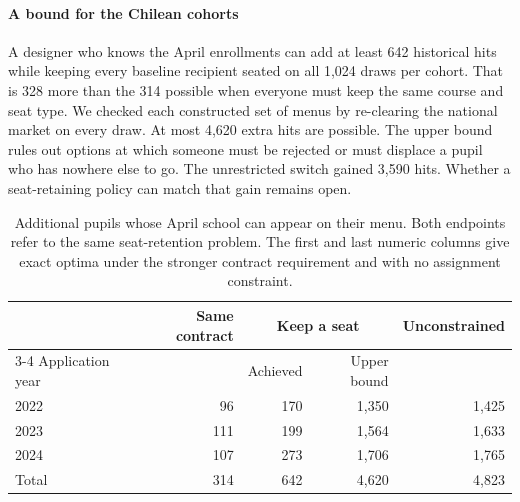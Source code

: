 \paragraph{A bound for the Chilean cohorts}
A designer who knows the April enrollments can add at least 642 historical hits while keeping every baseline recipient seated on all 1,024 draws per cohort. That is 328 more than the 314 possible when everyone must keep the same course and seat type. We checked each constructed set of menus by re-clearing the national market on every draw. At most 4,620 extra hits are possible. The upper bound rules out options at which someone must be rejected or must displace a pupil who has nowhere else to go. The unrestricted switch gained 3,590 hits. Whether a seat-retaining policy can match that gain remains open.

\begin{table}[ht]\centering\small
\caption{Additional pupils whose April school can appear on their menu. Both endpoints refer to the same seat-retention problem. The first and last numeric columns give exact optima under the stronger contract requirement and with no assignment constraint.}\label{tab:retention-bounds}
\begin{tabular}{@{}lrrrr@{}}\toprule
 & Same contract & \multicolumn{2}{c}{Keep a seat} & Unconstrained\\
\cmidrule(lr){3-4}
Application year & & Achieved & Upper bound & \\\midrule
2022 & 96 & 170 & 1,350 & 1,425\\
2023 & 111 & 199 & 1,564 & 1,633\\
2024 & 107 & 273 & 1,706 & 1,765\\
\midrule
Total & 314 & 642 & 4,620 & 4,823\\\bottomrule
\end{tabular}
\end{table}
